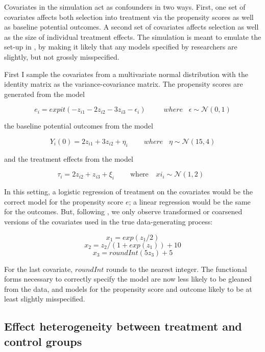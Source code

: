 \documentclass[hidelinks,11pt]{article}
\begin{document}
Covariates in the simulation act as confounders in two ways. First, one set of covariates affects both selection into treatment via the propensity scores as well as baseline potential outcomes. A second set of covariates affects selection as well as the size of individual treatment effects. The simulation is meant to emulate the set-up in \citet{kangshafer2007}, by making it likely that any models specified by researchers are slightly, but not grossly misspecified.

First I sample the covariates from a multivariate normal distribution with the identity matrix as the variance-covariance matrix. The propensity scores are generated from the model

$$e_i = expit(-z_{i1} - 2z_{i2} - 3z_{i3} - \epsilon_i) \;\;\;\;\;\;\;\;\; where\;\;\; \epsilon \sim \mathcal{N}(0,1)$$

the baseline potential outcomes from the model

$$Y_i(0) = 2z_{i1} + 3z_{i2} + \eta_i \;\;\;\;\;\;\;\; where\;\;\; \eta \sim \mathcal{N}(15,4)$$

and the treatment effects from the model

$$\tau_i = 2z_{i2} + z_{i3} + \xi_i\;\;\;\;\;\;\;\;\text{where} \;\;\;\ xi_i  \sim \mathcal{N}(1,2)\;\;$$

In this setting, a logistic regression of treatment on the covariates would be the correct model for the propensity score $e$; a linear regression would be the same for the outcomes. But, following \citet{kangshafer2007}, we only observe transformed or coarsened versions of the covariates used in the true data-generating process:

$$x_1 = exp(z_1 / 2)$$
$$x_2 = z_2 / (1 + exp(z_1)) + 10$$
$$x_3 = roundInt(5z_3) + 5$$

For the last covariate, $roundInt$ rounds to the nearest integer. The functional forms necessary to correctly specify the model are now less likely to be gleaned from the data, and models for the propensity score and outcome likely to be at least slightly misspecified.

\subsection{Effect heterogeneity between treatment and control groups}
\end{document}
